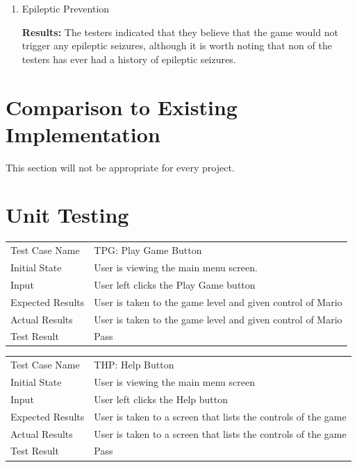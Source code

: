 \documentclass[12pt, titlepage]{article}
\begin{document}
\begin{enumerate}

\item{Epileptic Prevention\\}

\textbf{Results: }The testers indicated that they believe that the game would not trigger any epileptic seizures, although it is worth noting that non of the testers has ever had a history of epileptic seizures.

\end{enumerate}
	
\section{Comparison to Existing Implementation}	

This section will not be appropriate for every project.

\section{Unit Testing}

\begin{center}
\begin{tabular}{ | l | p{10cm} | }
\hline
Test Case Name &  TPG: Play Game Button	\\
Initial State &  User is viewing the main menu screen.	\\
Input & User left clicks the Play Game button	\\
Expected Results & User is taken to the game level and given control of Mario	\\
Actual Results &  User is taken to the game level and given control of Mario	\\
Test Result & Pass	\\
\hline
\end{tabular}
\end{center}

\begin{center}
\begin{tabular}{ | l | p{10cm} | }
\hline
Test Case Name & THP: Help Button	\\
Initial State & User is viewing the main menu screen	\\
Input & User left clicks the Help button	\\
Expected Results & User is taken to a screen that lists the controls of the game	\\
Actual Results & User is taken to a screen that lists the controls of the game	\\
Test Result & Pass	\\
\hline
\end{tabular}
\end{center}
\end{document}
